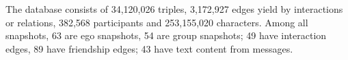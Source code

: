 The database consists of 34,120,026 triples, 3,172,927 edges yield by interactions or relations, 382,568 participants and 253,155,020 characters. Among all snapshots, 63 are ego snapshots, 54 are group snapshots; 49 have interaction edges, 89 have friendship edges; 43 have text content from messages.
